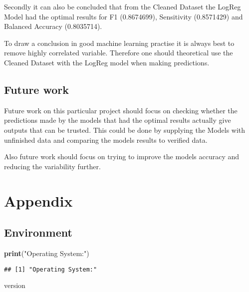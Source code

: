 \documentclass[
]{article}
\newenvironment{Shaded}{\begin{snugshade}}{\end{snugshade}}
\newcommand{\KeywordTok}[1]{\textcolor[rgb]{0.13,0.29,0.53}{\textbf{#1}}}
\newcommand{\NormalTok}[1]{#1}
\newcommand{\StringTok}[1]{\textcolor[rgb]{0.31,0.60,0.02}{#1}}
\begin{document}
Secondly it can also be concluded that from the Cleaned Dataset the
LogReg Model had the optimal results for F1 (0.8674699), Sensitivity
(0.8571429) and Balanced Accuracy (0.8035714).

To draw a conclusion in good machine learning practise it is always best
to remove highly correlated variable. Therefore one should theoretical
use the Cleaned Dataset with the LogReg model when making predictions.

\hypertarget{future-work}{%
\subsection{Future work}\label{future-work}}

Future work on this particular project should focus on checking whether
the predictions made by the models that had the optimal results actually
give outputs that can be trusted. This could be done by supplying the
Models with unfinished data and comparing the models results to verified
data.

Also future work should focus on trying to improve the models accuracy
and reducing the variability further.

\newpage

\hypertarget{appendix}{%
\section{Appendix}\label{appendix}}

\hypertarget{environment}{%
\subsection{Environment}\label{environment}}

\begin{Shaded}
\begin{Highlighting}[]
\KeywordTok{print}\NormalTok{(}\StringTok{"Operating System:"}\NormalTok{)}
\end{Highlighting}
\end{Shaded}

\begin{verbatim}
## [1] "Operating System:"
\end{verbatim}

\begin{Shaded}
\begin{Highlighting}[]
\NormalTok{version}
\end{Highlighting}
\end{Shaded}
\end{document}
